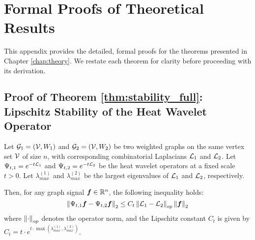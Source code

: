 \chapter{Formal Proofs of Theoretical Results}
\label{appendix:proofs}

This appendix provides the detailed, formal proofs for the theorems presented in Chapter \ref{chap:theory}. We restate each theorem for clarity before proceeding with its derivation.

\section{Proof of Theorem \ref{thm:stability_full}: Lipschitz Stability of the Heat Wavelet Operator}

\begin{theorem}[Restated]
Let $\mathcal{G}_1 = (\mathcal{V}, W_1)$ and $\mathcal{G}_2 = (\mathcal{V}, W_2)$ be two weighted graphs on the same vertex set $\mathcal{V}$ of size $n$, with corresponding combinatorial Laplacians $\mathcal{L}_1$ and $\mathcal{L}_2$. Let $\Psi_{t,1} = e^{-t\mathcal{L}_1}$ and $\Psi_{t,2} = e^{-t\mathcal{L}_2}$ be the heat wavelet operators at a fixed scale $t > 0$. Let $\lambda_{max}^{(1)}$ and $\lambda_{max}^{(2)}$ be the largest eigenvalues of $\mathcal{L}_1$ and $\mathcal{L}_2$, respectively.

Then, for any graph signal $\bm{f} \in \mathbb{R}^n$, the following inequality holds:
\begin{equation}
    \left\lVert\Psi_{t,1}\bm{f} - \Psi_{t,2}\bm{f}\right\rVert_2 \le C_t \left\lVert\mathcal{L}_1 - \mathcal{L}_2\right\rVert_{op} \left\lVert\bm{f}\right\rVert_2
\end{equation}
where $\left\lVert\cdot\right\rVert_{op}$ denotes the operator norm, and the Lipschitz constant $C_t$ is given by $C_t = t \cdot e^{t \cdot \max(\lambda_{max}^{(1)}, \lambda_{max}^{(2)})}$.
\end{theorem}

